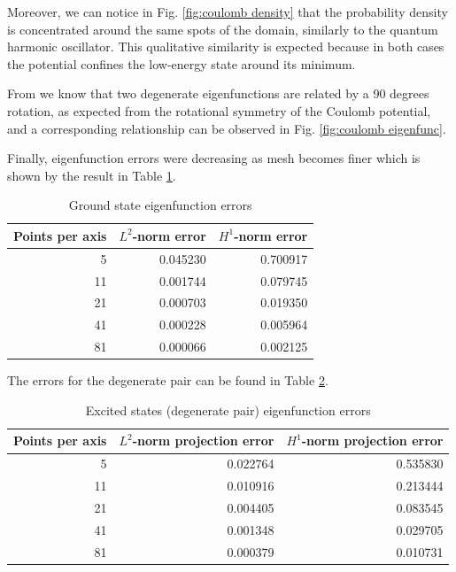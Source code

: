 \documentclass[acmsmall,screen]{MapleTrans}
\begin{document}
Moreover, we can notice in Fig. \ref{fig:coulomb density} that the probability density is concentrated around the same spots of the domain, similarly to the quantum harmonic oscillator. This qualitative similarity is expected because in both cases the potential confines the low-energy state around its minimum.

From \cite{b30} we know that two degenerate eigenfunctions are related by a 90 degrees rotation, as expected from the rotational symmetry of the Coulomb potential, and a corresponding relationship can be observed in Fig. \ref{fig:coulomb eigenfunc}. 
 
Finally, eigenfunction errors were decreasing as mesh becomes finer which is shown by the result in Table \ref{tab:coulomb eigenfunc errors}.
\begin{table}[H]
    \centering
    \caption{Ground state eigenfunction errors}
    \label{tab:coulomb eigenfunc errors}
    \begin{tabular}{rrr}
        \toprule
        Points per axis & $L^2$-norm error & $H^1$-norm error \\
        \midrule
        5 & 0.045230 & 0.700917 \\
        11 & 0.001744 & 0.079745 \\
        21 & 0.000703 & 0.019350 \\
        41 & 0.000228 & 0.005964 \\
        81 & 0.000066 & 0.002125 \\
        \bottomrule
    \end{tabular}
\end{table}

The errors for the degenerate pair can be found in Table \ref{tab:coulomb degenerate pair errors}.
\begin{table}[H]
    \centering
    \caption{Excited states (degenerate pair) eigenfunction errors}
    \label{tab:coulomb degenerate pair errors}
    \begin{tabular}{rrr}
        \toprule
        Points per axis & $L^2$-norm projection error & $H^1$-norm projection error \\
        \midrule
        5 & 0.022764 & 0.535830 \\
        11 & 0.010916 & 0.213444 \\
        21 & 0.004405 & 0.083545 \\
        41 & 0.001348 & 0.029705 \\
        81 & 0.000379 & 0.010731 \\
        \bottomrule
    \end{tabular}
\end{table}
\end{document}
